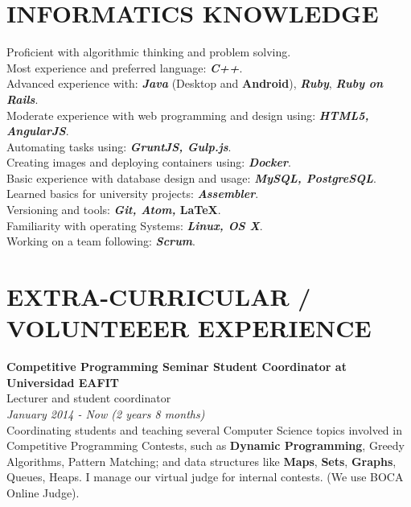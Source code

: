 \documentclass[margin, 10pt]{res} %
\begin{document}
\begin{resume}
\section{INFORMATICS KNOWLEDGE}
Proficient with algorithmic thinking and problem solving. \\
Most experience and preferred language: \textbf{\textit{C++}}. \\
Advanced experience with: \textbf{\textit{Java}} (Desktop and \textbf{Android}),
                          \textbf{\textit{Ruby}}, \textbf{\textit{Ruby on Rails}}. \\
Moderate experience with web programming and design using: \textbf{\textit{HTML5, AngularJS}}. \\
Automating tasks using: \textbf{\textit{GruntJS, Gulp.js}}. \\
Creating images and deploying containers using: \textbf{\textit{Docker}}. \\
Basic experience with database design and usage: \textbf{\textit{MySQL, PostgreSQL}}. \\
Learned basics for university projects: \textbf{\textit{Assembler}}. \\
Versioning and tools: \textbf{\textit{Git, Atom,} \LaTeX}.\\
Familiarity with operating Systems: \textbf{\textit{Linux, OS X}}. \\
Working on a team following: \textbf{\textit{Scrum}}.\\


\section{EXTRA-CURRICULAR / \\ VOLUNTEEER EXPERIENCE}
\textbf{Competitive Programming Seminar Student Coordinator at Universidad EAFIT} \\
Lecturer and student coordinator \\
\textit{January 2014 - Now (2 years 8 months)} \\
Coordinating students and teaching several Computer Science topics involved in Competitive
Programming Contests, such as \textbf{Dynamic Programming}, Greedy Algorithms, Pattern Matching;
and data structures like \textbf{Maps}, \textbf{Sets}, \textbf{Graphs}, Queues, Heaps. I manage our
virtual judge for internal contests. (We use BOCA Online Judge).


\end{resume}
\end{document}
